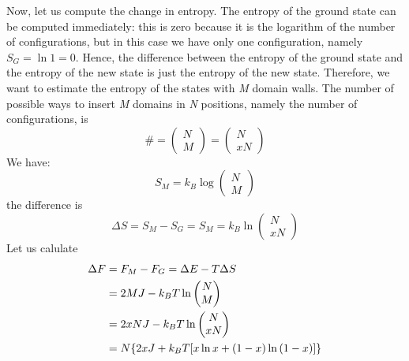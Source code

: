 \documentclass[../../Main/Main.tex]{subfiles}
\begin{document}
Now, let us compute the change in entropy.
The entropy of the ground state can be computed immediately: this is zero because it is the logarithm of the number of configurations, but in this case we have only one configuration, namely  \( S_G = \ln{1} =  0 \). Hence, the difference between the entropy of the ground state and the entropy of the new state is just the entropy of the new state.
Therefore, we want to estimate the entropy of the states with \emph{M} domain walls. 
The number of possible ways to insert \emph{M} domains in \emph{N} positions, namely the number of configurations, is
\begin{equation}
  \# = \begin{pmatrix}
  N \\
  M
  \end{pmatrix} = \begin{pmatrix}
  N \\
  xN
  \end{pmatrix}
\end{equation}
We have:
\begin{equation}
  S_M = k_B \log{\begin{pmatrix}
  N \\
  M
  \end{pmatrix}}
\end{equation}
the difference is
\begin{equation*}
  \Delta S = S_M -S_G = S_M = k_B \ln{\begin{pmatrix}
  N \\
  xN
  \end{pmatrix} }
\end{equation*}
Let us calulate
\begin{equation*}
\begin{split}
\Delta F  &= F_M - F_G = \Delta E - T \Delta S  \\
          &= 2 M J - k_B T \ln{\begin{pmatrix}
          N \\
          M
          \end{pmatrix} } \\
          & = 2xNJ - k_B T \ln{\begin{pmatrix}
          N \\
          xN
          \end{pmatrix} } \\
          & = N \qty{ 2xJ +k_B T \qty[x \ln{x} + (1-x)\ln{(1-x)}  ] }
\end{split}
\end{equation*}
\end{document}
